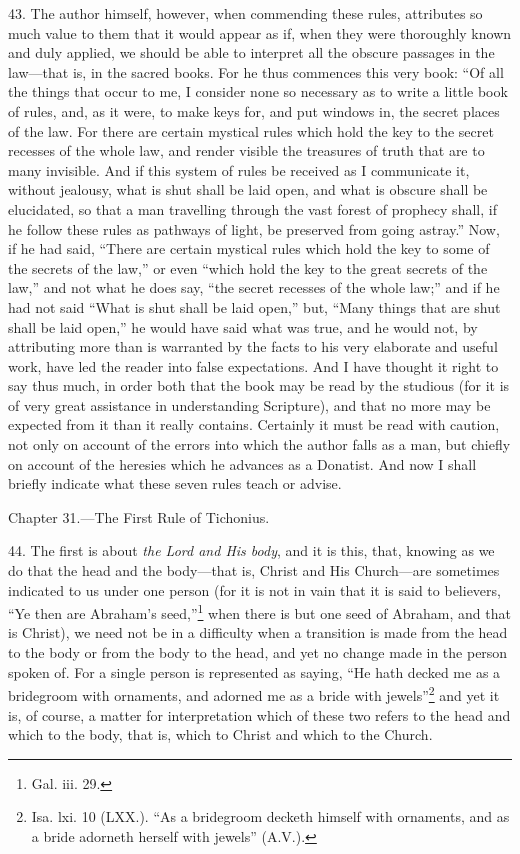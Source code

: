 43. The author himself, however, when commending these rules, attributes so much value to them that it would appear as if, when they were thoroughly known and duly applied, we should be able to interpret all the obscure passages in the law—that is, in the sacred books. For he thus commences this very book: “Of all the things that occur to me, I consider none so necessary as to write a little book of rules, and, as it were, to make keys for, and put windows in, the secret places of the law. For there are certain mystical rules which hold the key to the secret recesses of the whole law, and render visible the treasures of truth that are to many invisible. And if this system of rules be received as I communicate it, without jealousy, what is shut shall be laid open, and what is obscure shall be elucidated, so that a man travelling through the vast forest of prophecy shall, if he follow these rules as pathways of light, be preserved from going astray.” Now, if he had said, “There are certain mystical rules which hold the key to some of the secrets of the law,” or even “which hold the key to the great secrets of the law,” and not what he does say, “the secret recesses of the whole law;” and if he had not said “What is shut shall be laid open,” but, “Many things that are shut shall be laid open,” he would have said what was true, and he would not, by attributing more than is warranted by the facts to his very elaborate and useful work, have led the reader into false expectations. And I have thought it right to say thus much, in order both that the book may be read by the studious (for it is of very great assistance in understanding Scripture), and that no more may be expected from it than it really contains. Certainly it must be read with caution, not only on account of the errors into which the author falls as a man, but chiefly on account of the heresies which he advances as a Donatist. And now I shall briefly indicate what these seven rules teach or advise.


Chapter 31.—The First Rule of Tichonius.

44. The first is about \emph{the Lord and His body}, and it is this, that, knowing as we do that the head and the body—that is, Christ and His Church—are sometimes indicated to us under one person (for it is not in vain that it is said to believers, “Ye then are Abraham’s seed,”\footnote{Gal. iii. 29.} when there is but one seed of Abraham, and that is Christ), we need not be in a difficulty when a transition is made from the head to the body or from the body to the head, and yet no change made in the person spoken of. For a single person is represented as saying, “He hath decked me as a bridegroom with ornaments, and adorned me as a bride with jewels”\footnote{Isa. lxi. 10 (LXX.). “As a bridegroom decketh himself with ornaments, and as a bride adorneth herself with jewels” (A.V.).} and yet it is, of course, a matter for  interpretation which of these two refers to the head and which to the body, that is, which to Christ and which to the Church.


